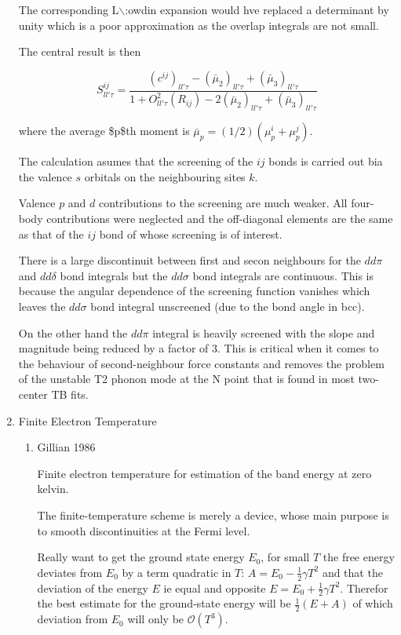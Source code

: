\documentclass[11pt]{article}
\begin{document}
\begin{enumerate}
The corresponding L$\backslash$:owdin expansion would hve replaced a determinant by unity
which is a poor approximation as the overlap integrals are not small. 

The central result is then 

\begin{equation}
S^{ij}_{ll'\tau} = \frac{ (c^{ij})_{ll'\tau} - (\bar{\mu}_2)_{ll'\tau} +
         (\bar{\mu}_{3})_{ll'\tau} }{ 1 +  O^2_{ll'\tau}(R_{ij})  - 2(\bar{\mu}_2)_{ll'\tau} +
                               (\bar{\mu}_{3})_{ll'\tau} }
\end{equation}

where the average \$p\$th moment is
\(\bar{\mu}_p = (1/2)(\mu^i_p + \mu^j_p)\).

The calculation asumes that the screening of the \(ij\) bonds is carried out bia
the valence \(s\) orbitals on the neighbouring sites \(k\). 

Valence \(p\) and \(d\) contributions to the screening are much
weaker. All four-body contributions were neglected and the off-diagonal
elements are the same as that of the \(ij\) bond of whose screening is of
interest. 

There is a large discontinuit between first and secon neighbours for the
\(dd\pi\) and \(dd\delta\) bond integrals but the \(dd\sigma\) bond integrals are
continuous. This is because the angular dependence of the screening function
vanishes which leaves the \(dd\sigma\) bond integral unscreened (due to the bond
angle in bcc). 

On the other hand the \(dd\pi\) integral is heavily screened with
the slope and magnitude being reduced by a factor of 3. This is critical when
it comes to the behaviour of second-neighbour force constants and removes the
problem of the unstable T2 phonon mode at the N point that is found in most
two-center TB fits. 
\item Finite Electron Temperature
\label{sec:orgdbdee45}
\begin{enumerate}
\item Gillian 1986
\label{sec:org3dcd0cb}
\cite{Gillan1989}

Finite electron temperature for estimation of the band energy at zero kelvin. 

The finite-temperature scheme is merely a device, whose main purpose is to
smooth discontinuities at the Fermi level.

Really want to get the ground state energy \(E_0\), for small \(T\) the free
energy deviates from \(E_0\) by a term quadratic in \(T\): \(A = E_0 -
\frac{1}{2}\gamma T^2\) and that the deviation of the energy \(E\) ie equal and
opposite \(E = E_0 + \frac{1}{2}\gamma T^2\). Therefor the best estimate for the
ground-state energy will be \(\frac{1}{2}(E + A)\) of which deviation from \(E_0\)
will only be \(\mathcal{O}(T^3)\).


\end{enumerate}
\end{enumerate}
\end{document}
